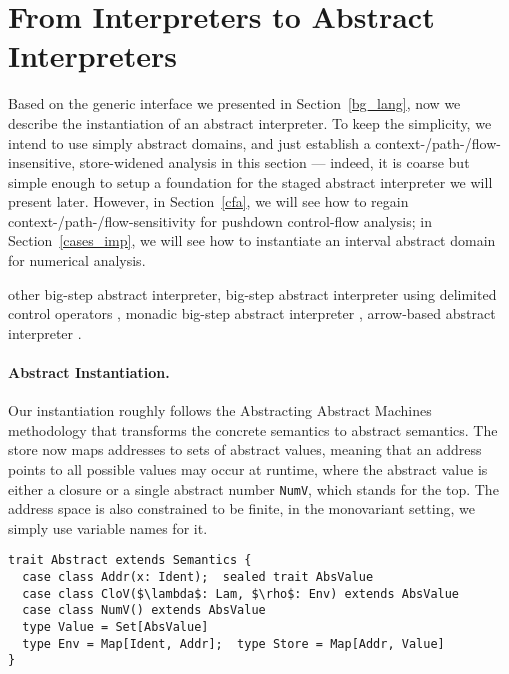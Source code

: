 \section{From Interpreters to Abstract Interpreters} \label{unstaged_abs}

Based on the generic interface we presented in Section~\ref{bg_lang}, 
now we describe the instantiation of an abstract interpreter.
To keep the simplicity, we intend to use simply abstract domains, and just establish a 
context-/path-/flow-insensitive, store-widened analysis in this section --- indeed, it is coarse
but simple enough to setup a foundation for the staged abstract interpreter we will present later.
However, in Section~\ref{cfa}, we will see how to regain context-/path-/flow-sensitivity 
for pushdown control-flow analysis; in Section~\ref{cases_imp}, we will see how to instantiate 
an interval abstract domain for numerical analysis.

 other big-step abstract interpreter, 
big-step abstract interpreter using delimited control operators \cite{Wei:2018:RAA:3243631.3236800},
monadic big-step abstract interpreter \cite{DBLP:journals/pacmpl/DaraisLNH17},
arrow-based abstract interpreter \cite{Keidel:2018:CSP:3243631.3236767}.

\paragraph{Abstract Instantiation.}
Our instantiation roughly follows the Abstracting Abstract Machines methodology 
\cite{DBLP:conf/icfp/HornM10, DBLP:journals/jfp/HornM12} that transforms the concrete semantics 
to abstract semantics. The store now maps addresses to sets of abstract values, meaning that an address points
to all possible values may occur at runtime, where the abstract value is either a closure or 
a single abstract number \texttt{NumV}, which stands for the top. The address space is also
constrained to be finite, in the monovariant setting, we simply use variable names for it.

\begin{lstlisting}
trait Abstract extends Semantics {
  case class Addr(x: Ident);  sealed trait AbsValue
  case class CloV($\lambda$: Lam, $\rho$: Env) extends AbsValue
  case class NumV() extends AbsValue
  type Value = Set[AbsValue]
  type Env = Map[Ident, Addr];  type Store = Map[Addr, Value]
}
\end{lstlisting}

